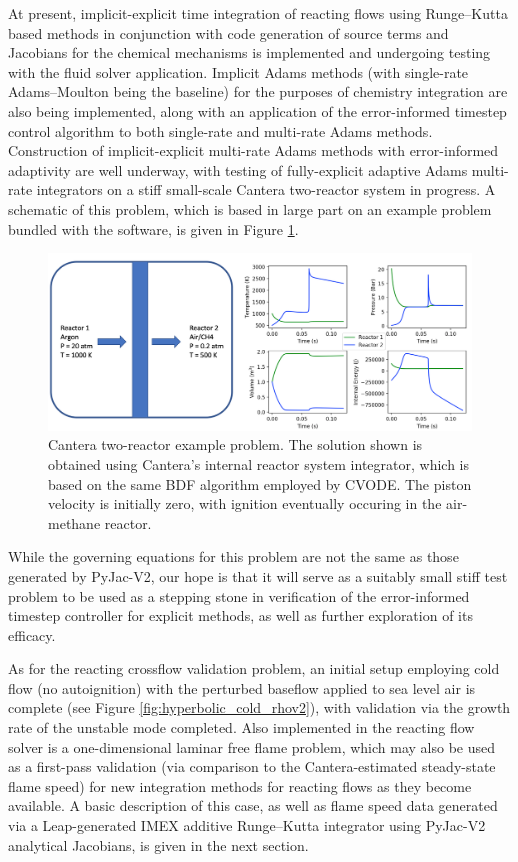 At present, implicit-explicit time integration of reacting flows using Runge--Kutta
based methods in conjunction with code generation of source terms and Jacobians for
the chemical mechanisms is implemented and undergoing testing with the fluid solver
application. Implicit Adams methods (with single-rate Adams--Moulton being the baseline)
for the purposes of chemistry integration are also being implemented, along with
an application of the error-informed timestep control algorithm to both
single-rate and multi-rate Adams methods. Construction of implicit-explicit multi-rate
Adams methods with error-informed adaptivity are well underway, with testing
of fully-explicit adaptive Adams multi-rate integrators on a stiff small-scale Cantera
\cite{cantera} two-reactor system in progress. A schematic of this problem, which is
based in large part on an example problem bundled with the software, is given in
Figure \ref{fig:cantera_reactors}.
\begin{figure}
\centering
\includegraphics[width=0.9\linewidth,trim=4 4 4 4,clip]{figures/cantera_reactors_soln.png}
\caption{Cantera two-reactor example problem. The solution shown is obtained using
	 Cantera's internal reactor system integrator, which is based on the same
	 BDF algorithm employed by CVODE. The piston velocity is initially zero,
	 with ignition eventually occuring in the air-methane reactor.}
\label{fig:cantera_reactors}
\end{figure}
While the governing equations for this problem are not the same as those generated
by PyJac-V2, our hope is that it will serve as a suitably small stiff test problem to be
used as a stepping stone in verification of the error-informed timestep controller
for explicit methods, as well as further exploration of its efficacy.

As for the reacting crossflow validation problem, an initial setup employing
cold flow (no autoignition) with the perturbed baseflow applied to sea level air
is complete (see Figure \ref{fig:hyperbolic_cold_rhov2}), with validation via the
growth rate of the unstable mode completed. Also implemented in the reacting flow
solver is a one-dimensional laminar free flame problem, which may also be used
as a first-pass validation (via comparison to the Cantera-estimated steady-state
flame speed) for new integration methods for reacting flows as they become available.
A basic description of this case, as well as flame speed data generated via a Leap-generated
IMEX additive Runge--Kutta integrator using PyJac-V2 analytical Jacobians, is given in the next section.

